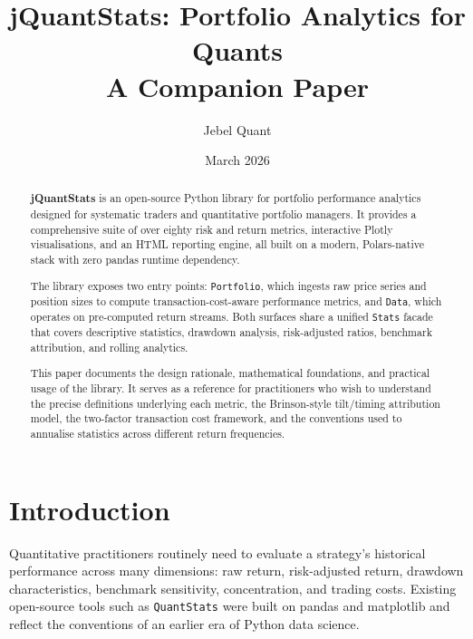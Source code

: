 \documentclass[11pt,a4paper]{article}
\begin{document}
\title{%
  \textbf{jQuantStats: Portfolio Analytics for Quants}\\[0.4em]
  {\large A Companion Paper}
}
\author{Jebel Quant}
\date{March 2026}

\maketitle

\begin{abstract}
\noindent
\textbf{jQuantStats} is an open-source Python library for portfolio performance
analytics designed for systematic traders and quantitative portfolio managers.
It provides a comprehensive suite of over eighty risk and return metrics,
interactive Plotly visualisations, and an HTML reporting engine, all built on a
modern, Polars-native stack with zero pandas runtime dependency.

The library exposes two entry points: \texttt{Portfolio}, which ingests raw
price series and position sizes to compute transaction-cost-aware performance
metrics, and \texttt{Data}, which operates on pre-computed return streams.
Both surfaces share a unified \texttt{Stats} facade that covers descriptive
statistics, drawdown analysis, risk-adjusted ratios, benchmark attribution, and
rolling analytics.

This paper documents the design rationale, mathematical foundations, and
practical usage of the library.  It serves as a reference for practitioners who
wish to understand the precise definitions underlying each metric, the
Brinson-style tilt/timing attribution model, the two-factor transaction cost
framework, and the conventions used to annualise statistics across different
return frequencies.
\end{abstract}

\tableofcontents
\newpage

\section{Introduction}
\label{sec:intro}

Quantitative practitioners routinely need to evaluate a strategy's historical
performance across many dimensions: raw return, risk-adjusted return, drawdown
characteristics, benchmark sensitivity, concentration, and trading costs.
Existing open-source tools such as \texttt{QuantStats} \citep{quantstats2019}
were built on pandas and matplotlib and reflect the conventions of an earlier
era of Python data science.
\end{document}

